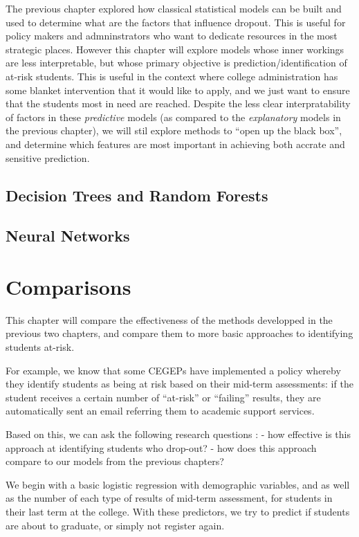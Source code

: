 \documentclass[]{book}
\theoremstyle{definition}
\theoremstyle{definition}
\theoremstyle{remark}
\begin{document}
The previous chapter explored how classical statistical models can be
built and used to determine what are the factors that influence dropout.
This is useful for policy makers and admninstrators who want to dedicate
resources in the most strategic places. However this chapter will
explore models whose inner workings are less interpretable, but whose
primary objective is prediction/identification of at-risk students. This
is useful in the context where college administration has some blanket
intervention that it would like to apply, and we just want to ensure
that the students most in need are reached. Despite the less clear
interpratability of factors in these \emph{predictive} models (as
compared to the \emph{explanatory} models in the previous chapter), we
will stil explore methods to ``open up the black box'', and determine
which features are most important in achieving both accrate and
sensitive prediction.

\section{Decision Trees and Random
Forests}\label{decision-trees-and-random-forests}

\section{Neural Networks}\label{neural-networks}

\chapter{Comparisons}\label{comparisons}

This chapter will compare the effectiveness of the methods developped in
the previous two chapters, and compare them to more basic approaches to
identifying students at-risk.

For example, we know that some CEGEPs have implemented a policy whereby
they identify students as being at risk based on their mid-term
assessments: if the student receives a certain number of ``at-risk'' or
``failing'' results, they are automatically sent an email referring them
to academic support services.

Based on this, we can ask the following research questions : - how
effective is this approach at identifying students who drop-out? - how
does this approach compare to our models from the previous chapters?

We begin with a basic logistic regression with demographic variables,
and as well as the number of each type of results of mid-term
assessment, for students in their last term at the college. With these
predictors, we try to predict if students are about to graduate, or
simply not register again.
\end{document}
